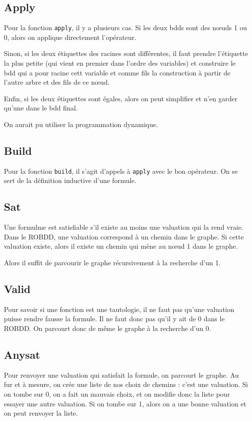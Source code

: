 \documentclass[12pt]{article}
\def\code#1{\texttt{#1}}
\begin{document}
\subsection*{Apply}
Pour la fonction \code{apply}, il y a plusieurs cas.
Si les deux bdds sont des n\oe uds 1 ou 0, alors on applique directement l'opérateur.

Sinon, si les deux étiquettes des racines sont différentes, il faut prendre l'étiquette la plus petite (qui vient en premier dans l'ordre des variables) et construire le bdd qui a pour racine cett variable et comme fils la construction à partir de l'autre arbre et des fils de ce n\oe ud.

Enfin, si les deux étiquettes sont égales, alors on peut simplifier et n'en garder qu'une dans le bdd final.


On aurait pu utiliser la programmation dynamique. %

\subsection*{Build}
Pour la fonction \code{build}, il s'agit d'appels à \code{apply} avec le bon opérateur. On se sert de la définition inductive d'une formule.

\subsection*{Sat}
Une formulme est satisfiable s'il existe au moins une valuation qui la rend vraie. Dans le ROBDD, une valuation correspond à un chemin dans le graphe. Si cette valuation existe, alors il existe un chemin qui mène au n\oe ud 1 dans le graphe. 

Alors il suffit de parcourir le graphe récursivement à la recherche d'un 1.

\subsection*{Valid}
Pour savoir si une fonction est une tautologie, il ne faut pas qu'une valuation puisse rendre fausse la formule. Il ne faut donc pas qu'il y ait de 0 dans le ROBDD. On parcourt donc de même le graphe à la recherche d'un 0.

\subsection*{Anysat}
Pour renvoyer une valuation qui satisfait la formule, on parcourt le graphe. Au fur et à mesure, on crée une liste de nos choix de chemins : c'est une valuation. Si on tombe sur 0, on a fait un mauvais choix, et on modifie donc la liste pour essayer une autre valuation. Si on tombe sur 1, alors on a une bonne valuation et on peut renvoyer la liste.
\end{document}
